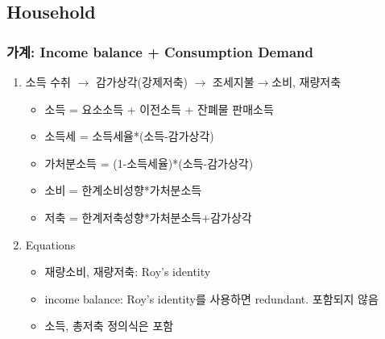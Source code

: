 \documentclass[10pt,compress,slidetop,%
			   hyperref={unicode},xcolor={svgnames},%
			   t]{beamer}
\begin{document}
\subsection{Household}
\begin{frame}
\frametitle{가계: Income balance + Consumption Demand}
\bigskip
\begin{enumerate}
\item{소득 수취 $\rightarrow$ 감가상각(강제저축) $\rightarrow$ 조세지불$\rightarrow$소비, 재량저축}
\begin{itemize}
\item{소득 = 요소소득 + 이전소득 + 잔폐물 판매소득}
\item{소득세 = 소득세율*(소득-감가상각)}
\item{가처분소득 = (1-소득세율)*(소득-감가상각)}
\item{소비 = 한계소비성향*가처분소득}
\item{저축 = 한계저축성향*가처분소득+감가상각}
\end{itemize}
\bigskip
\item{Equations}
	\begin{itemize}
	\item{재량소비, 재량저축: Roy's identity}
	\item{income balance: Roy's identity를 사용하면 redundant. 포함되지 않음}
	\item{소득, 총저축 정의식은 포함}
	\end{itemize}
\end{enumerate}
\end{frame}
\end{document}
